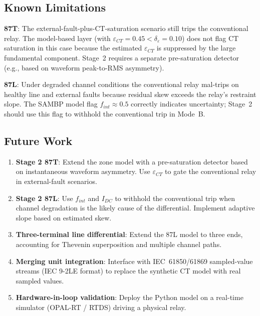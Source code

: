\documentclass[12pt,a4paper]{article}
\begin{document}
\subsection{Known Limitations}

\textbf{87T}: The external-fault-plus-CT-saturation scenario still trips
the conventional relay.  The model-based layer (with $\varepsilon_{CT} = 0.45 <
\delta_\varepsilon = 0.10$) does not flag CT saturation in this case because
the estimated $\varepsilon_{CT}$ is suppressed by the large fundamental
component.  Stage~2 requires a separate pre-saturation detector (e.g., based
on waveform peak-to-RMS asymmetry).

\textbf{87L}: Under degraded channel conditions the conventional relay
mal-trips on healthy line and external faults because residual skew exceeds
the relay's restraint slope.  The SAMBP model flag $f_{int} \approx 0.5$
correctly indicates uncertainty; Stage~2 should use this flag to withhold
the conventional trip in Mode~B.

\subsection{Future Work}
\label{sec:future}

\begin{enumerate}
  \item \textbf{Stage 2 87T}: Extend the zone model with a pre-saturation
        detector based on instantaneous waveform asymmetry. Use $\varepsilon_{CT}$
        to gate the conventional relay in external-fault scenarios.
  \item \textbf{Stage 2 87L}: Use $f_{int}$ and $I_{DC}$ to withhold
        the conventional trip when channel degradation is the likely cause
        of the differential.  Implement adaptive slope based on estimated
        skew.
  \item \textbf{Three-terminal line differential}: Extend the 87L model
        to three ends, accounting for Thevenin superposition and multiple
        channel paths.
  \item \textbf{Merging unit integration}: Interface with IEC~61850/61869
        sampled-value streams (IEC 9-2LE format) to replace the synthetic
        CT model with real sampled values.
  \item \textbf{Hardware-in-loop validation}: Deploy the Python model on
        a real-time simulator (OPAL-RT / RTDS) driving a physical relay.
\end{enumerate}
\end{document}
